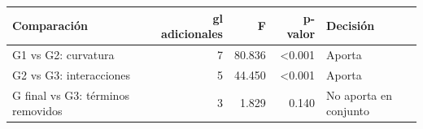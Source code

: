 \begin{tabular}{lrrrl}
\toprule
Comparación & gl adicionales & F & p-valor & Decisión \\
\midrule
G1 vs G2: curvatura & 7 & 80.836 & <0.001 & Aporta \\
G2 vs G3: interacciones & 5 & 44.450 & <0.001 & Aporta \\
G final vs G3: términos removidos & 3 & 1.829 & 0.140 & No aporta en conjunto \\
\bottomrule
\end{tabular}
